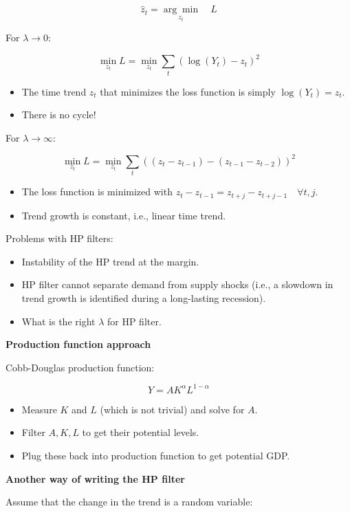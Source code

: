 \documentclass{article}
\begin{document}
\[\hat{z}_t=\underset{z_t}{\arg\min}\quad L \]

For $\lambda\to0$:

\[\min_{z_t} L=\min_{z_t}\sum_t(\log(Y_t)-z_t)^2 \]

\begin{itemize}
    \item The time trend $z_t$ that minimizes the loss function is simply $\log(Y_t)=z_t$.
    \item There is no cycle!
\end{itemize}

For $\lambda\to\infty$:

\[\min_{z_t} L=\min_{z_t}\sum_t ((z_t-z_{t-1}) - (z_{t-1}-z_{t-2}))^2 \]

\begin{itemize}
    \item The loss function is minimized with $z_t-z_{t-1}=z_{t+j}-z_{t+j-1}\quad\forall t, j$.
    \item Trend growth is constant, i.e., linear time trend.
\end{itemize}

Problems with HP filters:

\begin{itemize}
    \item Instability of the HP trend at the margin.
    \item HP filter cannot separate demand from supply shocks (i.e., a slowdown in trend growth is identified during a long-lasting recession).
    \item What is the right $\lambda$ for HP filter.
\end{itemize}

\textbf{Production function approach}

Cobb-Douglas production function:

\[Y=AK^{\alpha}L^{1-\alpha} \]

\begin{itemize}
    \item Measure $K$ and $L$ (which is not trivial) and solve for $A$.
    \item Filter $A, K, L$ to get their potential levels.
    \item Plug these back into production function to get potential GDP.
\end{itemize}

\textbf{Another way of writing the HP filter}

Assume that the change in the trend is a random variable:
\end{document}
